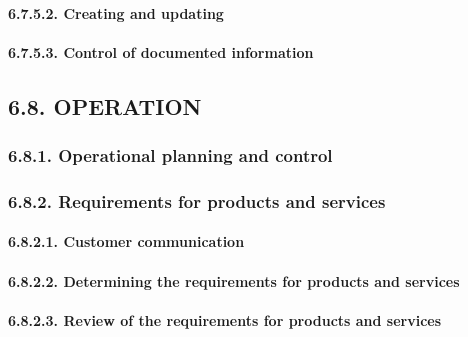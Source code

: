 \documentclass[
]{article}
\begin{document}
\hypertarget{creating-and-updating}{%
\paragraph{6.7.5.2. Creating and updating}\label{creating-and-updating}}

\hypertarget{control-of-documented-information}{%
\paragraph{6.7.5.3. Control of documented
information}\label{control-of-documented-information}}

\hypertarget{operation}{%
\subsection{6.8. OPERATION}\label{operation}}

\hypertarget{operational-planning-and-control}{%
\subsubsection{6.8.1. Operational planning and
control}\label{operational-planning-and-control}}

\hypertarget{requirements-for-products-and-services}{%
\subsubsection{6.8.2. Requirements for products and
services}\label{requirements-for-products-and-services}}

\hypertarget{customer-communication}{%
\paragraph{6.8.2.1. Customer
communication}\label{customer-communication}}

\hypertarget{determining-the-requirements-for-products-and-services}{%
\paragraph{6.8.2.2. Determining the requirements for products and
services}\label{determining-the-requirements-for-products-and-services}}

\hypertarget{review-of-the-requirements-for-products-and-services}{%
\paragraph{6.8.2.3. Review of the requirements for products and
services}\label{review-of-the-requirements-for-products-and-services}}
\end{document}
